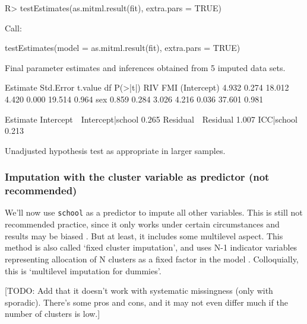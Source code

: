 \documentclass[
]{jss}
\begin{document}
\begin{CodeChunk}
\begin{CodeInput}
R> testEstimates(as.mitml.result(fit), extra.pars = TRUE)
\end{CodeInput}
\begin{CodeOutput}

Call:

testEstimates(model = as.mitml.result(fit), extra.pars = TRUE)

Final parameter estimates and inferences obtained from 5 imputed data sets.

             Estimate Std.Error   t.value        df   P(>|t|)       RIV       FMI 
(Intercept)     4.932     0.274    18.012     4.420     0.000    19.514     0.964 
sex             0.859     0.284     3.026     4.216     0.036    37.601     0.981 

                            Estimate 
Intercept~~Intercept|school    0.265 
Residual~~Residual             1.007 
ICC|school                     0.213 

Unadjusted hypothesis test as appropriate in larger samples.
\end{CodeOutput}
\end{CodeChunk}

\hypertarget{imputation-with-the-cluster-variable-as-predictor-not-recommended}{%
\subsubsection{Imputation with the cluster variable as predictor (not
recommended)}\label{imputation-with-the-cluster-variable-as-predictor-not-recommended}}

We'll now use \texttt{school} as a predictor to impute all other
variables. This is still not recommended practice, since it only works
under certain circumstances and results may be biased
\citep{drec15, ende16}. But at least, it includes some multilevel
aspect. This method is also called `fixed cluster imputation', and uses
N-1 indicator variables representing allocation of N clusters as a fixed
factor in the model \citep{reit06, ende16}. Colloquially, this is
`multilevel imputation for dummies'.

{[}TODO: Add that it doesn't work with systematic missingness (only with
sporadic). There's some pros and cons, and it may not even differ much
if the number of clusters is low.{]}
\end{document}
